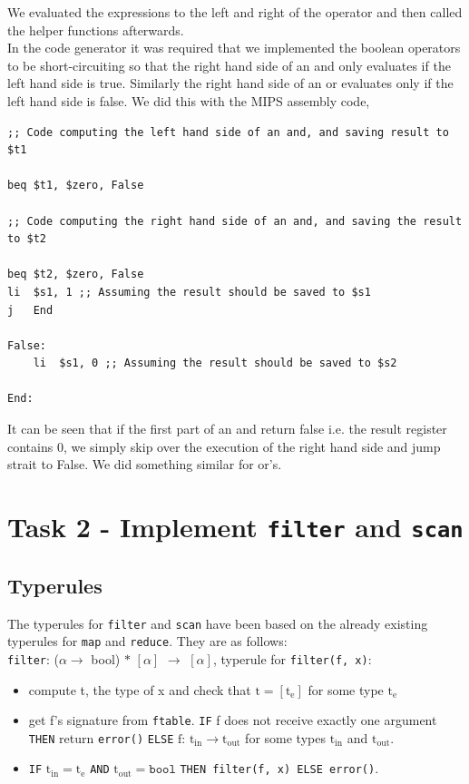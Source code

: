 \documentclass[11pt]{article}
\begin{document}
    We evaluated the expressions to the left and right of the operator and then
    called the helper functions afterwards. \\

    In the code generator it was required that we implemented the boolean
    operators to be short-circuiting so that the right hand side of an and only
    evaluates if the left hand side is true. Similarly the right hand side of an
    or evaluates only if the left hand side is false.  We did this with the MIPS
    assembly code,

    \begin{lstlisting}[basicstyle=\small]
;; Code computing the left hand side of an and, and saving result to $t1

beq $t1, $zero, False

;; Code computing the right hand side of an and, and saving the result to $t2

beq $t2, $zero, False
li  $s1, 1 ;; Assuming the result should be saved to $s1
j   End

False:
    li  $s1, 0 ;; Assuming the result should be saved to $s2

End:
    \end{lstlisting}

    It can be seen that if the first part of an and return false i.e. the
    result register contains 0, we simply skip over the execution of the right
    hand side and jump strait to False.  We did something similar for or's.

    \section{Task 2 - Implement \texttt{filter} and \texttt{scan}}
    \subsection{Typerules}
    The typerules for \texttt{filter} and \texttt{scan} have been based on the
    already existing typerules for \texttt{map} and \texttt{reduce}. They are as
    follows: \\

    \texttt{filter}: ($\alpha \rightarrow$ bool) $\ast$ $[\alpha]$ $\rightarrow$
    $[\alpha]$, typerule for \texttt{filter(f, x)}:
    \vspace{-2.5mm}
    \begin{itemize}[noitemsep]
        \item compute t, the type of x and check that $\text{t} =
            [\text{t}_\text{e}]$ for some type $\text{t}_\text{e}$
        \item get f's signature from \texttt{ftable}. \texttt{IF} f does not
            receive exactly one argument \texttt{THEN} return \texttt{error()}
            \texttt{ELSE} $\text{f: t}_{\text{in}} \rightarrow
            \text{t}_{\text{out}}$ for some types $\text{t}_{\text{in}}$ and
            $\text{t}_{\text{out}}$.
        \item \texttt{IF} $\text{t}_{\text{in}} = \text{t}_\text{e}$
            \texttt{AND} $\text{t}_{\text{out}} = \texttt{bool}$ \texttt{THEN
            filter(f, x) ELSE error()}.
    \end{itemize}
\end{document}
